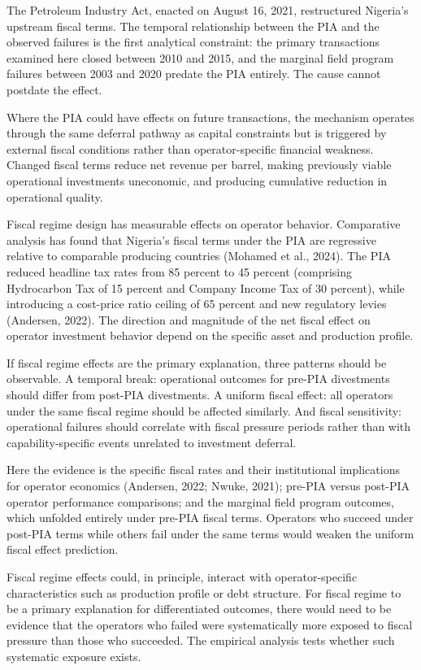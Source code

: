 The Petroleum Industry Act, enacted on August 16, 2021, restructured
Nigeria's upstream fiscal terms. The temporal relationship between the
PIA and the observed failures is the first analytical constraint: the
primary transactions examined here closed between 2010 and 2015, and the
marginal field program failures between 2003 and 2020 predate the PIA
entirely. The cause cannot postdate the effect.

Where the PIA could have effects on future transactions, the mechanism
operates through the same deferral pathway as capital constraints but is
triggered by external fiscal conditions rather than operator-specific
financial weakness. Changed fiscal terms reduce net revenue per barrel,
making previously viable operational investments uneconomic, and
producing cumulative reduction in operational quality.

Fiscal regime design has measurable effects on operator behavior.
Comparative analysis has found that Nigeria's fiscal terms under the PIA
are regressive relative to comparable producing countries (Mohamed et
al., 2024). The PIA reduced headline tax rates from 85 percent to 45
percent (comprising Hydrocarbon Tax of 15 percent and Company Income Tax
of 30 percent), while introducing a cost-price ratio ceiling of 65
percent and new regulatory levies (Andersen, 2022). The direction and
magnitude of the net fiscal effect on operator investment behavior
depend on the specific asset and production profile.

If fiscal regime effects are the primary explanation, three patterns
should be observable. A temporal break: operational outcomes for pre-PIA
divestments should differ from post-PIA divestments. A uniform fiscal
effect: all operators under the same fiscal regime should be affected
similarly. And fiscal sensitivity: operational failures should correlate
with fiscal pressure periods rather than with capability-specific events
unrelated to investment deferral.

Here the evidence is the specific fiscal rates and their institutional
implications for operator economics (Andersen, 2022; Nwuke, 2021);
pre-PIA versus post-PIA operator performance comparisons; and the
marginal field program outcomes, which unfolded entirely under pre-PIA
fiscal terms. Operators who succeed under post-PIA terms while others
fail under the same terms would weaken the uniform fiscal effect
prediction.

Fiscal regime effects could, in principle, interact with
operator-specific characteristics such as production profile or debt
structure. For fiscal regime to be a primary explanation for
differentiated outcomes, there would need to be evidence that the
operators who failed were systematically more exposed to fiscal pressure
than those who succeeded. The empirical analysis tests whether such
systematic exposure exists.

